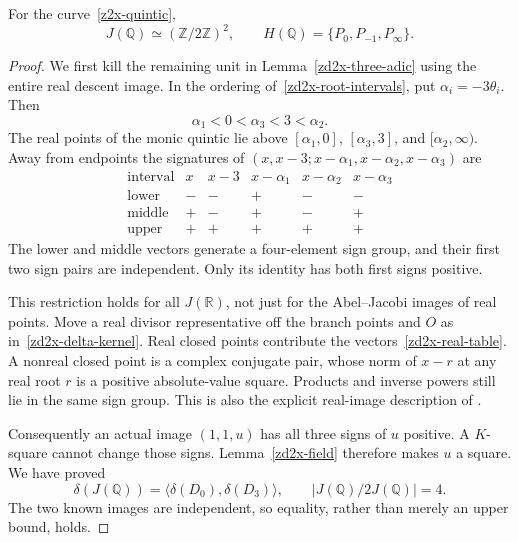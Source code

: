 \begin{theorem}
\label{zd2x-rank-and-points}
For the curve~\eqref{z2x-quintic},
\[
 J(\mathbb Q)\simeq(\mathbb Z/2\mathbb Z)^2,\qquad
 H(\mathbb Q)=\{P_0,P_{-1},P_\infty\}.
\]
\end{theorem}
\begin{proof}
We first kill the remaining unit in
Lemma~\ref{zd2x-three-adic} using the entire real descent
image. In the ordering of~\eqref{zd2x-root-intervals},
put \(\alpha_i=-3\theta_i\). Then
\[
 \alpha_1<0<\alpha_3<3<\alpha_2.
\]
The real points of the monic quintic lie above
\([\alpha_1,0]\), \([\alpha_3,3]\), and
\([\alpha_2,\infty)\). Away from endpoints the signatures
of \((x,x-3;x-\alpha_1,x-\alpha_2,x-\alpha_3)\) are
\begin{equation}
 \begin{array}{c|cc|ccc}
  \text{interval}&x&x-3&x-\alpha_1&x-\alpha_2&x-\alpha_3\\ \hline
  \text{lower}&-&-&+&-&-\\
  \text{middle}&+&-&+&-&+\\
  \text{upper}&+&+&+&+&+
 \end{array}
 \label{zd2x-real-table}
\end{equation}
The lower and middle vectors generate a four-element sign
group, and their first two sign pairs are independent.
Only its identity has both first signs positive.

This restriction holds for all \(J(\mathbb R)\), not just
for the Abel--Jacobi images of real points. Move a real
divisor representative off the branch points and \(O\) as
in~\eqref{zd2x-delta-kernel}. Real closed points contribute
the vectors~\eqref{zd2x-real-table}. A nonreal closed point
is a complex conjugate pair, whose norm of \(x-r\) at any
real root \(r\) is a positive absolute-value square.
Products and inverse powers still lie in the same sign
group. This is also the explicit real-image description
of \cite[Lemma~4.8]{StollTwoDescent2001}.

Consequently an actual image \((1,1,u)\) has all three
signs of \(u\) positive. A \(K\)-square cannot change
those signs. Lemma~\ref{zd2x-field} therefore makes \(u\)
a square. We have proved
\begin{equation}
 \delta(J(\mathbb Q))=
 \langle\delta(D_0),\delta(D_3)\rangle,\qquad
 |J(\mathbb Q)/2J(\mathbb Q)|=4.
 \label{zd2x-four-global}
\end{equation}
The two known images are independent, so equality, rather
than merely an upper bound, holds.


\end{proof}
